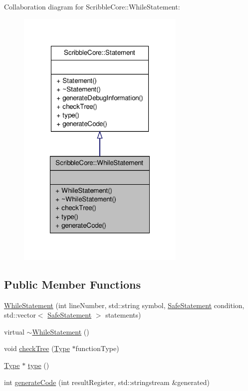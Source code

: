 Collaboration diagram for Scribble\-Core\-:\-:While\-Statement\-:
\nopagebreak
\begin{figure}[H]
\begin{center}
\leavevmode
\includegraphics[width=228pt]{class_scribble_core_1_1_while_statement__coll__graph}
\end{center}
\end{figure}
\subsection*{Public Member Functions}
\begin{DoxyCompactItemize}
\item 
\hyperlink{class_scribble_core_1_1_while_statement_a391f48c446bd92f94323ab1e4fd6597b}{While\-Statement} (int line\-Number, std\-::string symbol, \hyperlink{namespace_scribble_core_a2ad5bf236bc9164cb56f564685f15a11}{Safe\-Statement} condition, std\-::vector$<$ \hyperlink{namespace_scribble_core_a2ad5bf236bc9164cb56f564685f15a11}{Safe\-Statement} $>$ statements)
\item 
virtual \hyperlink{class_scribble_core_1_1_while_statement_a16883bfa3e1797d85a924b387422feab}{$\sim$\-While\-Statement} ()
\item 
void \hyperlink{class_scribble_core_1_1_while_statement_aa2533fad6a03fe23f87e6247816c8da1}{check\-Tree} (\hyperlink{class_scribble_core_1_1_type}{Type} $\ast$function\-Type)
\item 
\hyperlink{class_scribble_core_1_1_type}{Type} $\ast$ \hyperlink{class_scribble_core_1_1_while_statement_a969760fa6514a6691c7759f95eaa69e0}{type} ()
\item 
int \hyperlink{class_scribble_core_1_1_while_statement_ac9ce44b3804d77ca0e2f12cfedbaf9f5}{generate\-Code} (int result\-Register, std\-::stringstream \&generated)
\end{DoxyCompactItemize}


